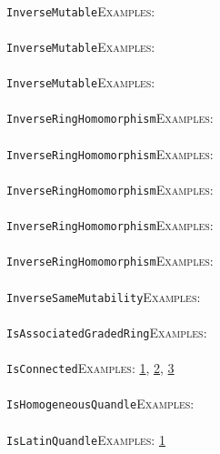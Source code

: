 \documentclass[a4paper,11pt]{report}
\begin{document}
{{ \\
 \texttt{InverseMutable}{\nobreakspace}{\nobreakspace}{\nobreakspace}{\nobreakspace}\textsc{Examples:} \\
 \\
 \texttt{InverseMutable}{\nobreakspace}{\nobreakspace}{\nobreakspace}{\nobreakspace}\textsc{Examples:} \\
 \\
 \texttt{InverseMutable}{\nobreakspace}{\nobreakspace}{\nobreakspace}{\nobreakspace}\textsc{Examples:} \\
 \\
 \texttt{InverseRingHomomorphism}{\nobreakspace}{\nobreakspace}{\nobreakspace}{\nobreakspace}\textsc{Examples:} \\
 \\
 \texttt{InverseRingHomomorphism}{\nobreakspace}{\nobreakspace}{\nobreakspace}{\nobreakspace}\textsc{Examples:} \\
 \\
 \texttt{InverseRingHomomorphism}{\nobreakspace}{\nobreakspace}{\nobreakspace}{\nobreakspace}\textsc{Examples:} \\
 \\
 \texttt{InverseRingHomomorphism}{\nobreakspace}{\nobreakspace}{\nobreakspace}{\nobreakspace}\textsc{Examples:} \\
 \\
 \texttt{InverseRingHomomorphism}{\nobreakspace}{\nobreakspace}{\nobreakspace}{\nobreakspace}\textsc{Examples:} \\
 \\
 \texttt{InverseSameMutability}{\nobreakspace}{\nobreakspace}{\nobreakspace}{\nobreakspace}\textsc{Examples:} \\
 \\
 \texttt{IsAssociatedGradedRing}{\nobreakspace}{\nobreakspace}{\nobreakspace}{\nobreakspace}\textsc{Examples:} \\
 \\
 \texttt{IsConnected}{\nobreakspace}{\nobreakspace}{\nobreakspace}{\nobreakspace}\textsc{Examples:} \href{../www/SideLinks/About/aboutQuandles2.html} {1}{\nobreakspace}, \href{../www/SideLinks/About/aboutQuandles.html} {2}{\nobreakspace}, \href{../www/SideLinks/About/aboutKnotsQuandles.html} {3}{\nobreakspace} \\
 \\
 \texttt{IsHomogeneousQuandle}{\nobreakspace}{\nobreakspace}{\nobreakspace}{\nobreakspace}\textsc{Examples:} \\
 \\
 \texttt{IsLatinQuandle}{\nobreakspace}{\nobreakspace}{\nobreakspace}{\nobreakspace}\textsc{Examples:} \href{../www/SideLinks/About/aboutQuandles.html} {1}{\nobreakspace} \\
}}
\end{document}

